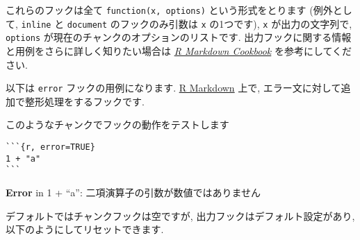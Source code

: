 \documentclass[
]{bxjsreport}
\newenvironment{Shaded}{\begin{snugshade}}{\end{snugshade}}
\newcommand{\AttributeTok}[1]{\textcolor[rgb]{0.77,0.63,0.00}{#1}}
\newcommand{\ControlFlowTok}[1]{\textcolor[rgb]{0.13,0.29,0.53}{\textbf{#1}}}
\newcommand{\FunctionTok}[1]{\textcolor[rgb]{0.00,0.00,0.00}{#1}}
\newcommand{\NormalTok}[1]{#1}
\newcommand{\SpecialCharTok}[1]{\textcolor[rgb]{0.00,0.00,0.00}{#1}}
\newcommand{\StringTok}[1]{\textcolor[rgb]{0.31,0.60,0.02}{#1}}
\begin{document}
これらのフックは全て \texttt{function(x,\ options)} という形式をとります
(例外として, \texttt{inline} と \texttt{document} のフックのみ引数は
\texttt{x} の1つです), \texttt{x} が出力の文字列で, \texttt{options}
が現在のチャンクのオプションのリストです.
出力フックに関する情報と用例をさらに詳しく知りたい場合は
\href{https://bookdown.org/yihui/rmarkdown-cookbook/output-hooks.html}{\emph{R
Markdown Cookbook}} を参考にしてください.

以下は \texttt{error} フックの用例になります.
\href{https://rmarkdown.rstudio.com}{R Markdown} 上で,
エラー文に対して追加で整形処理をするフックです.

\begin{Shaded}
\end{Shaded}

このようなチャンクでフックの動作をテストします

\begin{verbatim}
```{r, error=TRUE}
1 + "a"
```
\end{verbatim}

\textbf{Error} in 1 + ``a'': 二項演算子の引数が数値ではありません

デフォルトではチャンクフックは空ですが,
出力フックはデフォルト設定があり, 以下のようにしてリセットできます.

\begin{Shaded}
\end{Shaded}
\end{document}
